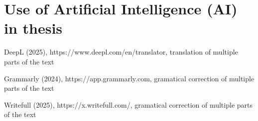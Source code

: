 \setcounter{figure}{0}
\setcounter{listing}{0}

\chapter{Use of Artificial Intelligence (AI) in thesis \label{cha:ai-use} }

DeepL (2025), https://www.deepl.com/en/translator, translation of multiple parts of the text

Grammarly (2024), https://app.grammarly.com, gramatical correction of multiple parts of the text

Writefull (2025), https://x.writefull.com/, gramatical correction of multiple parts of the text

